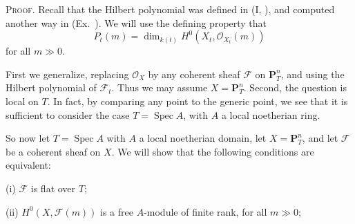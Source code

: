 {\smallskip
\noindent\textsc{Proof.} Recall that the Hilbert polynomial was defined in (I, ), and computed another way in (Ex.~). We will use the defining property that
\[
P_t(m)=\dim_{k(t)}H^0(X_t,\mathcal O_{X_t}(m))
\]
for all $m\gg0$.

First we generalize, replacing $\mathcal O_X$ by any coherent sheaf $\mathcal F$ on $\mathbf P_T^n$, and using the Hilbert polynomial of $\mathcal F_t$. Thus we may assume $X=\mathbf P_T^n$. Second, the question is local on $T$. In fact, by comparing any point to the generic point, we see that it is sufficient to consider the case $T=\operatorname{Spec} A$, with $A$ a local noetherian ring.

So now let $T=\operatorname{Spec} A$ with $A$ a local noetherian domain, let $X=\mathbf P_T^n$, and let $\mathcal F$ be a coherent sheaf on $X$. We will show that the following conditions are equivalent:

\noindent\hypertarget{result-III-9.9-i}{}(i) $\mathcal F$ is flat over $T$;

\noindent\hypertarget{result-III-9.9-ii}{}(ii) $H^0(X,\mathcal F(m))$ is a free $A$-module of finite rank, for all $m\gg0$;}
